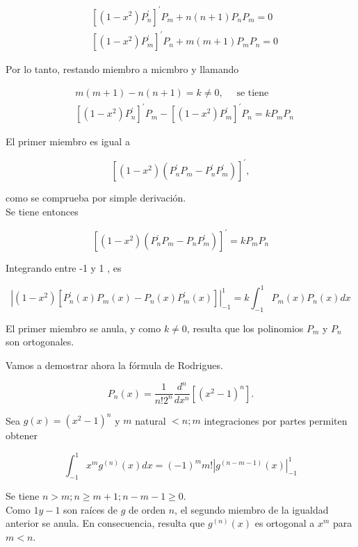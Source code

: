 \documentclass[10pt]{article}
\theoremstyle{plain}
\theoremstyle{definition}
\theoremstyle{remark}
\begin{document}
$$
\begin{aligned}
& {\left[\left(1-x^{2}\right) P_{n}^{\prime}\right]^{\prime} P_{m}+n(n+1) P_{n} P_{m}=0} \\
& {\left[\left(1-x^{2}\right) P_{m}^{\prime}\right]^{\prime} P_{n}+m(m+1) P_{m} P_{n}=0}
\end{aligned}
$$

Por lo tanto, restando miembro a micmbro y llamando

$$
\begin{aligned}
& m(m+1)-n(n+1)=k \neq 0, \quad \text { se tiene } \\
& {\left[\left(1-x^{2}\right) P_{n}^{\prime}\right]^{\prime} P_{m}-\left[\left(1-x^{2}\right) P_{m}^{\prime}\right]^{\prime} P_{n}=k P_{m} P_{n}}
\end{aligned}
$$

El primer miembro es igual a

$$
\left[\left(1-x^{2}\right)\left(P_{n}^{\prime} P_{m}-P_{n}^{\prime} P_{m}^{\prime}\right)\right]^{\prime},
$$

como se comprueba por simple derivación.\\
Se tiene entonces

$$
\left[\left(1-x^{2}\right)\left(P_{n}^{\prime} P_{m}-P_{n} P_{m}^{\prime}\right)\right]^{\prime}=k P_{m} P_{n}
$$

Integrando entre -1 y 1 , es

$$
\left|\left(1-x^{2}\right)\left[P_{n}^{\prime}(x) P_{m}(x)-P_{n}(x) P_{m}^{\prime}(x)\right]\right|_{-1}^{1}=k \int_{-1}^{1} P_{m}(x) P_{n}(x) d x
$$

El primer miembro se anula, y como $k \neq 0$, resulta que los polinomios $P_{m}$ y $P_{n}$ son ortogonales.

Vamos a demostrar ahora la fórmula de Rodrigues.


\begin{equation*}
P_{n}(x)=\frac{1}{n!2^{n}} \frac{d^{n}}{d x^{n}}\left[\left(x^{2}-1\right)^{n}\right] . \tag{9-4}
\end{equation*}


Sea $g(x)=\left(x^{2}-1\right)^{n}$ y $m$ natural $<n ; m$ integraciones por partes permiten obtener

$$
\int_{-1}^{1} x^{m} g^{(n)}(x) d x=(-1)^{m} m!\left|g^{(n-m-1)}(x)\right|_{-1}^{1}
$$

Se tiene $n>m ; n \geqslant m+1 ; n-m-1 \geqslant 0$.\\
Como $1 y-1$ son raíces de $g$ de orden $n$, el segundo miembro de la igualdad anterior se anula. En consecuencia, resulta que $g^{(n)}(x)$ es ortogonal a $x^{m}$ para $m<n$.
\end{document}

